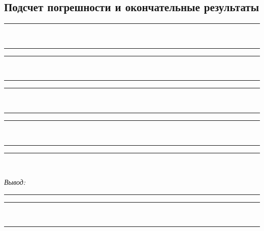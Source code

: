\documentclass[10pt, pscyr, nonums]{hedlabwork}
\begin{document}
    \subsection{Подсчет погрешности и окончательные результаты}
    \center
    \rule{.95\textwidth}{.5pt} \\ \rule{.95\textwidth}{.5pt}
    \rule{.95\textwidth}{.5pt} \\ \rule{.95\textwidth}{.5pt}
    \rule{.95\textwidth}{.5pt} \\ \rule{.95\textwidth}{.5pt}
    \rule{.95\textwidth}{.5pt} \\ \rule{.95\textwidth}{.5pt}
    \rule{.95\textwidth}{.5pt} \\ \vspace*{2em}
    
    \emph{Вывод:} \rule{.885\textwidth}{.5pt}
    \rule{.95\textwidth}{.5pt} \\ \rule{.95\textwidth}{.5pt}
\end{document}
